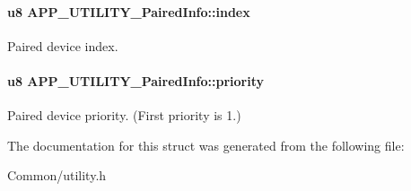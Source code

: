 \paragraph[{\texorpdfstring{index}{index}}]{\setlength{\rightskip}{0pt plus 5cm}u8 A\+P\+P\+\_\+\+U\+T\+I\+L\+I\+T\+Y\+\_\+\+Paired\+Info\+::index}\hypertarget{struct_a_p_p___u_t_i_l_i_t_y___paired_info_a290fb7fb6f0cedb7defd38094147f4bc}{}\label{struct_a_p_p___u_t_i_l_i_t_y___paired_info_a290fb7fb6f0cedb7defd38094147f4bc}
Paired device index. 
\paragraph[{\texorpdfstring{priority}{priority}}]{\setlength{\rightskip}{0pt plus 5cm}u8 A\+P\+P\+\_\+\+U\+T\+I\+L\+I\+T\+Y\+\_\+\+Paired\+Info\+::priority}\hypertarget{struct_a_p_p___u_t_i_l_i_t_y___paired_info_a81fb387ef50bb118b4468320c7378aab}{}\label{struct_a_p_p___u_t_i_l_i_t_y___paired_info_a81fb387ef50bb118b4468320c7378aab}
Paired device priority. (First priority is 1.) 

The documentation for this struct was generated from the following file\+:\begin{DoxyCompactItemize}
\item 
Common/utility.\+h\end{DoxyCompactItemize}

